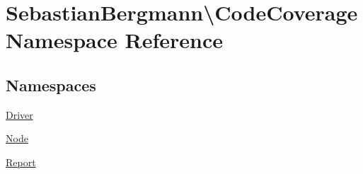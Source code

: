 \hypertarget{namespace_sebastian_bergmann_1_1_code_coverage}{}\section{Sebastian\+Bergmann\textbackslash{}Code\+Coverage Namespace Reference}
\label{namespace_sebastian_bergmann_1_1_code_coverage}
\subsection*{Namespaces}
\begin{DoxyCompactItemize}
\item 
 \mbox{\hyperlink{namespace_sebastian_bergmann_1_1_code_coverage_1_1_driver}{Driver}}
\item 
 \mbox{\hyperlink{namespace_sebastian_bergmann_1_1_code_coverage_1_1_node}{Node}}
\item 
 \mbox{\hyperlink{namespace_sebastian_bergmann_1_1_code_coverage_1_1_report}{Report}}
\end{DoxyCompactItemize}
